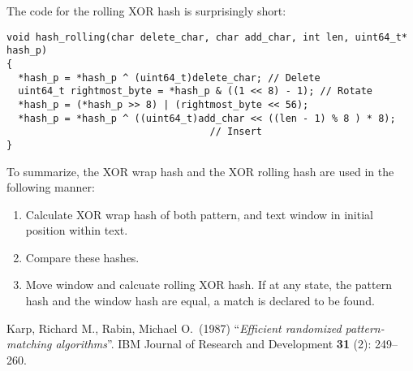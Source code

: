 \documentclass[11pt, a4paper]{amsart}
\begin{document}
The code for the rolling XOR hash is surprisingly short:

\begin{verbatim}
void hash_rolling(char delete_char, char add_char, int len, uint64_t* hash_p)
{
  *hash_p = *hash_p ^ (uint64_t)delete_char; // Delete
  uint64_t rightmost_byte = *hash_p & ((1 << 8) - 1); // Rotate
  *hash_p = (*hash_p >> 8) | (rightmost_byte << 56);
  *hash_p = *hash_p ^ ((uint64_t)add_char << ((len - 1) % 8 ) * 8);
                                   // Insert
}
\end{verbatim}

To summarize, the XOR wrap hash and the XOR rolling hash 
are used in the following manner: 
\begin{enumerate}
    \item Calculate XOR wrap hash of both pattern, and text window
    in initial position within text.
    \item Compare these hashes.
    \item Move window and calcuate rolling XOR hash. If at any state,
    the pattern hash and the window hash are equal, a match is declared 
    to be found.
\end{enumerate}

{\footnotesize
\begin{thebibliography}{99}
 Karp, Richard M., Rabin, Michael O.~(1987) ``{\it Efficient randomized pattern-matching algorithms}''. 
IBM Journal of Research and Development {\bf 31} (2): 249–260.
\end{thebibliography}
} %
\end{document}
